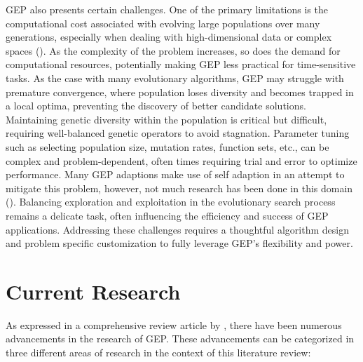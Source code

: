 \noindent GEP also presents certain challenges. One of the primary limitations is the computational cost associated with evolving large populations over many generations, especially when dealing with high-dimensional data or complex spaces (\cite{zhong2017gene}). As the complexity of the problem increases, so does the demand for computational resources, potentially making GEP less practical for time-sensitive tasks. As the case with many evolutionary algorithms, GEP may struggle with premature convergence, where population loses diversity and becomes trapped in a local optima, preventing the discovery of better candidate solutions. Maintaining genetic diversity within the population is critical but difficult, requiring well-balanced genetic operators to avoid stagnation. Parameter tuning such as selecting population size, mutation rates, function sets, etc., can be complex and problem-dependent, often times requiring trial and error to optimize performance. Many GEP adaptions make use of self adaption in an attempt to mitigate this problem, however, not much research has been done in this domain (\cite{zhong2017gene}). Balancing exploration and exploitation in the evolutionary search process remains a delicate task, often influencing the efficiency and success of GEP applications. Addressing these challenges requires a thoughtful algorithm design and problem specific customization to fully leverage GEP's flexibility and power.

\section{Current Research}\label{sec:gep_current_research}
As expressed in a comprehensive review article by \cite{zhong2017gene}, there have been numerous advancements in the research of GEP. These advancements can be categorized in three different areas of research in the context of this literature review: \bigskip

